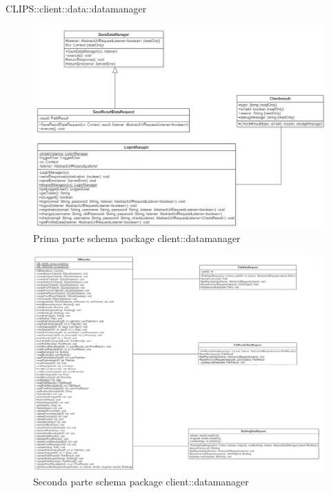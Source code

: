 \begin{componente}{CLIPS::client::data::datamanager}
\begin{figure}[h!]
\centering
\includegraphics[scale=0.4]{img/package/png/client--datamanager1.png}
\caption{Prima parte schema package client::datamanager}
 \end{figure}
 \begin{figure}[h!]
 	\centering
 	\includegraphics[scale=0.4]{img/package/png/client--datamanager2.png}
 	\caption{Seconda parte schema package client::datamanager}
 \end{figure}
 \begin{figure}[h!]
 	\centering

\end{figure}
\end{componente}
